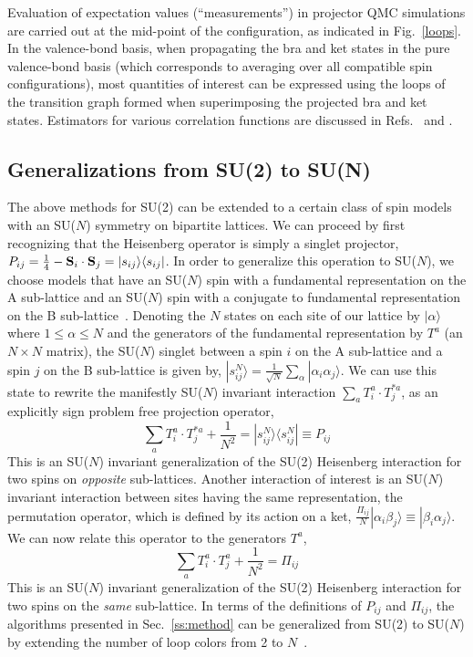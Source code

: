 \documentclass[range]{ar2e}
\begin{document}
Evaluation of expectation values (``measurements'') in projector QMC simulations are carried out at the mid-point of the configuration, as indicated 
in Fig.~\ref{loops}. In the valence-bond basis, when propagating the bra and ket states in the pure valence-bond basis (which corresponds to averaging 
over all compatible spin configurations), most quantities of interest can be expressed using the loops of the transition graph formed when superimposing 
the projected bra and ket states. Estimators for various correlation functions are discussed in Refs.~\cite{Beach06} and \cite{Tang11a}.

\subsection {Generalizations from SU(2) to SU(N)}
\label{ss:su2N}

The above methods for SU(2) can be extended to a certain
class of spin models with an SU($N$) symmetry on bipartite
lattices. We can proceed by first recognizing that the Heisenberg operator is simply a singlet projector, $P_{ij}=\hbox{$\frac{1}{4}$}-{\bf S}_i\cdot {\bf S}_j = |s_{ij}\rangle\langle s_{ij}|$.
In order to generalize this operation to SU($N$), we choose models that have an SU($N$) spin with a
fundamental representation on the A sub-lattice and an SU($N$) spin with
a conjugate to fundamental representation on the B sub-lattice~\cite{affleck1985:lgN,Read89}.
Denoting the $N$ states on each site of our lattice by $|\alpha\rangle$ where
$1\leq \alpha \leq N$ 
and the generators of the fundamental representation by $T^a$ (an
$N\times N$ matrix),
the SU($N$) singlet between a spin $i$ on the A sub-lattice and a spin $j$ on the
B sub-lattice is given by, $|s^N_{ij}\rangle = \frac{1}{\sqrt{N}}\sum_\alpha
|\alpha_i\alpha_j\rangle$. We can use this state to rewrite the
manifestly SU($N$) invariant interaction  $\sum_a T^a_i \cdot
T^{*a}_j$, as an explicitly sign problem free projection operator,
\begin{equation}
\sum_a T^a_i \cdot
T^{*a}_j + \frac{1}{N^2} = |s^N_{ij}\rangle \langle s^N_{ij}|\equiv P_{ij}
\end{equation}
This is an SU($N$) invariant generalization of the SU(2) Heisenberg interaction
for two spins on {\em opposite} sub-lattices. Another interaction of interest is an SU($N$) invariant interaction
between sites having the same representation, the permutation
operator, which is defined by its action on a ket,
$\frac{\Pi_{ij}}{N}|\alpha_i\beta_j\rangle \equiv |\beta_i\alpha_j\rangle$. We can now relate this operator to the generators $T^a$,
\begin{equation}
\sum_a T^a_i \cdot
T^{a}_j +\frac{1}{N^2} =\Pi_{ij}
\end{equation}
This is an SU($N$) invariant generalization of the SU(2) Heisenberg
interaction for two spins on the {\em same} sub-lattice.
In terms of the definitions of $P_{ij}$ and $\Pi_{ij}$, the algorithms presented in
Sec.~\ref{ss:method} can be generalized from SU(2) to SU($N$) by
extending the number of loop colors from 2 to $N$~\cite{harada2003:sun,beach2009:sun,kaul2011:j1j2}.
\end{document}
